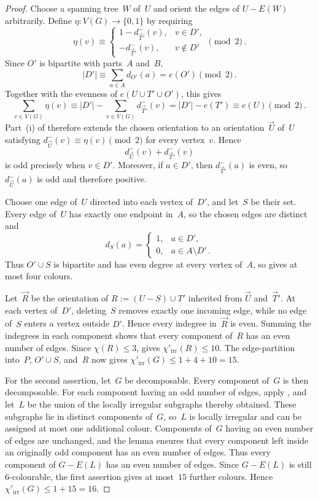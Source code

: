 \documentclass[12pt,reqno,a4paper]{amsart}
\newcommand{\lir}{\chi'_{\mathrm{irr}}}
\begin{document}
\begin{proof}
  Choose a spanning tree~$W$ of~$U$ and orient the edges of $U-E(W)$
  arbitrarily. 
  Define $\eta \colon V(G) \to \{0,1\}$ by requiring
  \[
    \eta(v) \equiv
    \begin{cases}
      1-d^-_{\vec T'}(v), & v\in D',\\
      -d^-_{\vec T'}(v), & v\notin D'
    \end{cases}
    \pmod 2 \,.
  \]
  Since $O'$ is bipartite with parts~$A$ and~$B$,
  \[
    |D'| \equiv \sum_{a \in A} d_{O'}(a) = e(O') \pmod 2 \,.
  \]
  Together with the evenness of $e(U \cup T' \cup O')$, this gives
  \[
    \sum_{v \in V(G)} \eta(v)
      \equiv |D'| - \sum_{v \in V(G)} d^-_{\vec T'}(v)
      = |D'| - e(T')
      \equiv e(U) \pmod 2 \, .
  \]
  Part~(i) of  therefore extends the chosen
  orientation to an orientation~$\vec U$ of~$U$ satisfying $d^-_{\vec U}(v)
  \equiv \eta(v) \pmod 2$ for every vertex~$v$. 
  Hence
  \[
    d^-_{\vec U}(v) + d^-_{\vec T'}(v)
  \]
  is odd precisely when $v \in D'$.
  Moreover, if $a \in D'$, then $d^-_{\vec T'}(a)$ is even, so $d^-_{\vec U}(a)$
  is odd and therefore positive.

  Choose one edge of~$U$ directed into each vertex of~$D'$, and let~$S$
  be their set.
  Every edge of~$U$ has exactly one endpoint in~$A$, so the chosen edges are
  distinct and
  \[
    d_S(a) =
    \begin{cases}
      1, & a \in D',\\
      0, & a \in A \setminus D' \, .
    \end{cases}
  \]
  Thus $O'\cup S$ is bipartite and has even degree at every vertex of~$A$, so
   gives at most four colours.

  Let~$\vec R$ be the orientation of $R := (U - S) \cup T'$ inherited from
  $\vec U$ and~$\vec T'$. 
  At each vertex of~$D'$, deleting~$S$ removes exactly one incoming edge, while
  no edge of~$S$ enters a vertex outside $D'$.
  Hence every indegree in~$\vec R$ is even. 
  Summing the indegrees in each component shows that every component of~$R$ has
  an even number of edges. 
  Since $\chi(R) \le 3$,  gives $\lir(R) \le 10$.
  The edge-partition into~$P$, $O' \cup S$, and~$R$ now gives
  $\lir(G) \le 1 + 4 + 10 = 15$.

  For the second assertion, let~$G$ be decomposable. 
  Every component of~$G$ is then decomposable. 
  For each component having an odd number of edges, apply
  , and let~$L$ be the union of the locally irregular
  subgraphs thereby obtained. 
  These subgraphs lie in distinct components of~$G$, so~$L$ is locally
  irregular and can be assigned at most one additional colour.
  Components of~$G$ having an even number of edges are unchanged, and the lemma
  ensures that every component left inside an originally odd component has an
  even number of edges. 
  Thus every component of $G-E(L)$ has an even number of edges. 
  Since $G-E(L)$ is still $6$-colourable, the first assertion gives at
  most~$15$ further colours.
  Hence $\lir(G) \le 1 + 15 = 16$.
\end{proof}
\end{document}
